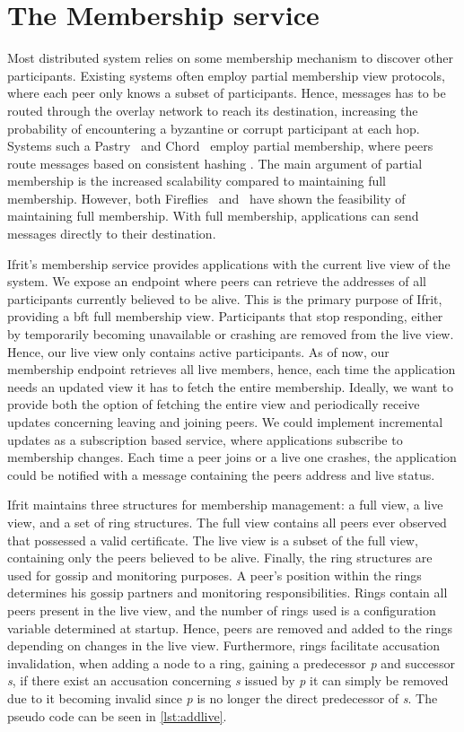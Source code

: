 \documentclass[USenglish]{uit-thesis}
\begin{document}
\section{The Membership service}
Most distributed system relies on some membership mechanism to discover other participants.
Existing systems often employ partial membership view protocols, where each peer only knows a subset of participants.
Hence, messages has to be routed through the overlay network to reach its destination, increasing the probability of encountering a byzantine or corrupt participant at each hop.
Systems such a Pastry~\cite{pastry} and Chord~\cite{chord} employ partial membership, where peers route messages based on consistent hashing \cite{consthash}.
The main argument of partial membership is the increased scalability compared to maintaining full membership.
However, both Fireflies~\cite{flies} and~\cite{onehop} have shown the feasibility of maintaining full membership.
With full membership, applications can send messages directly to their destination.

Ifrit's membership service provides applications with the current live view of the system.
We expose an endpoint where peers can retrieve the addresses of all participants currently believed to be alive.
This is the primary purpose of Ifrit, providing a \gls{bft} full membership view.
Participants that stop responding, either by temporarily becoming unavailable or crashing are removed from the live view.
Hence, our live view only contains active participants.
As of now, our membership endpoint retrieves all live members, hence, each time the application needs an updated view it has to fetch the entire membership.
Ideally, we want to provide both the option of fetching the entire view and periodically receive updates concerning leaving and joining peers.
We could implement incremental updates as a subscription based service, where applications subscribe to membership changes.
Each time a peer joins or a live one crashes, the application could be notified with a message containing the peers address and live status.

Ifrit maintains three structures for membership management: a full view, a live view, and a set of ring structures.
The full view contains all peers ever observed that possessed a valid certificate.
The live view is a subset of the full view, containing only the peers believed to be alive.
Finally, the ring structures are used for gossip and monitoring purposes.
A peer's position within the rings determines his gossip partners and monitoring responsibilities.
Rings contain all peers present in the live view, and the number of rings used is a configuration variable determined at startup.
Hence, peers are removed and added to the rings depending on changes in the live view.
Furthermore, rings facilitate accusation invalidation, when adding a node to a ring, gaining a predecessor \textit{p} and successor \textit{s}, if there exist an accusation concerning \textit{s} issued by \textit{p} it can simply be removed due to it becoming invalid since \textit{p} is no longer the direct predecessor of \textit{s}.
The pseudo code can be seen in \autoref{lst:addlive}.
\end{document}
